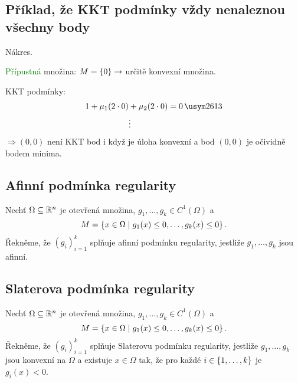 \subsection{Příklad, že KKT podmínky vždy nenaleznou všechny body}
\begin{multicols}{2}
    Nákres.
    \hspace{2em}
    \begin{figure}[H]
    \end{figure}

\columnbreak

    \textcolor{green}{Přípustná} množina: $M = \left\lbrace 0 \right\rbrace \rightarrow$ určitě konvexní množina.

    KKT podmínky: 
    \begin{align*}
        1 + \mu_1 (2 \cdot 0) &+ \mu_2 (2 \cdot 0) = 0 \, \xmark \\
        &\vdots
    \end{align*}
    $\Rightarrow (0,0)$ není KKT bod i když je úloha konvexní a bod $(0,0)$ je očividně bodem minima.
\end{multicols}

\subsection{Afinní podmínka regularity}\label{afinniPodm}
Nechť $\Omega \subseteq \mathbb{R}^n$ je otevřená množina, $g_1, \dots, g_k \in C^1 (\Omega)$ a 
\[
    M = \left\lbrace x \in \Omega \mid g_1(x) \leq 0, \dots, g_k(x) \leq 0 \right\rbrace.
\]
Řekněme, že $(g_i)_{i=1}^k$ splňuje afinní podmínku regularity, jestliže $g_1, \dots, g_k$ jsou afinní.

\subsection{Slaterova podmínka regularity}\label{slaterPodm}
Nechť $\Omega \subseteq \mathbb{R}^n$ je otevřená množina, $g_1, \dots, g_k \in C^1 (\Omega)$ a 
\[
    M = \left\lbrace x \in \Omega \mid g_1(x) \leq 0, \dots, g_k(x) \leq 0 \right\rbrace.
\]
Řekněme, že $(g_i)_{i=1}^k$ splňuje Slaterovu podmínku regularity, jestliže $g_1, \dots, g_k$ jsou konvexní na $\Omega$
a existuje $x \in \Omega$ tak, že pro každé $i \in \left\lbrace 1, \dots, k \right\rbrace$ je $g_i(x) < 0$.

